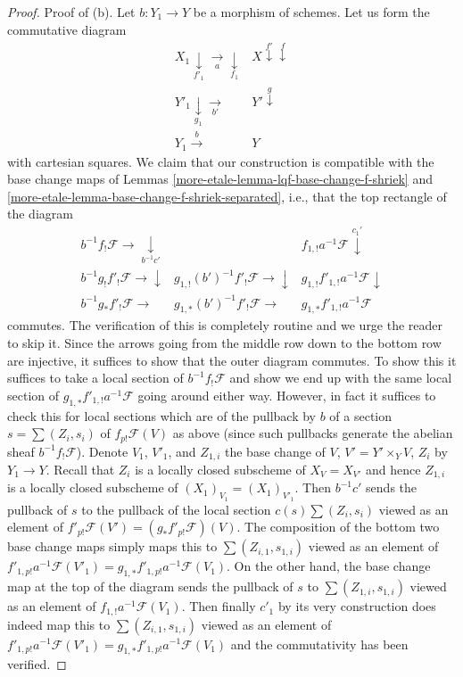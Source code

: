 \begin{proof}
\medskip\noindent
Proof of (b). Let $b : Y_1 \to Y$ be a morphism of schemes. Let us form the
commutative diagram
$$
\begin{array}{cc}X_1 \underset{f'_1}{\downarrow}\underset{a}{\longrightarrow}\underset{f_1}{\downarrow} & X \overset{f'}{\downarrow}\overset{f}{\downarrow} \\ Y'_1 \underset{g_1}{\downarrow}\underset{b'}{\longrightarrow} & Y' \overset{g}{\downarrow} \\ Y_1 \overset{b}{\longrightarrow} & Y\end{array}
$$
with cartesian squares. We claim that our construction is compatible
with the base change maps of Lemmas \ref{more-etale-lemma-lqf-base-change-f-shriek}
and \ref{more-etale-lemma-base-change-f-shriek-separated}, i.e.,
that the top rectangle of the diagram
$$
\begin{array}{ccc}b^{-1}f_!\mathcal{F} \longrightarrow\underset{b^{-1}c'}{\downarrow} &  & f_{1, !}a^{-1}\mathcal{F} \overset{c_1'}{\downarrow} \\ b^{-1}g_!f'_!\mathcal{F} \longrightarrow\downarrow & g_{1, !}(b')^{-1}f'_!\mathcal{F} \longrightarrow\downarrow & g_{1, !}f'_{1, !}a^{-1}\mathcal{F} \downarrow \\ b^{-1}g_*f'_!\mathcal{F} \longrightarrow & g_{1, *}(b')^{-1}f'_!\mathcal{F} \longrightarrow & g_{1, *}f'_{1, !}a^{-1}\mathcal{F}\end{array}
$$
commutes. The verification of this is completely routine and we
urge the reader to skip it. Since the arrows going from the middle
row down to the bottom row are injective, it suffices to show that
the outer diagram commutes.
To show this it suffices to take a local section of
$b^{-1}f_!\mathcal{F}$ and show we end up with the same local
section of $g_{1, *}f'_{1, !}a^{-1}\mathcal{F}$
going around either way. However, in fact it suffices to check
this for local sections which are of the pullback by $b$ of
a section $s = \sum (Z_i, s_i)$ of $f_{p!}\mathcal{F}(V)$
as above (since such pullbacks generate the abelian sheaf
$b^{-1}f_!\mathcal{F}$). Denote $V_1$, $V'_1$, and $Z_{1, i}$
the base change of $V$, $V' = Y' \times_Y V$, $Z_i$ by $Y_1 \to Y$.
Recall that $Z_i$ is a locally closed subscheme of $X_V = X_{V'}$
and hence $Z_{1, i}$ is a locally closed subscheme
of $(X_1)_{V_1} = (X_1)_{V'_1}$. Then $b^{-1}c'$ sends the pullback
of $s$ to the pullback of the local section $c(s) \sum (Z_i, s_i)$ viewed
as an element of $f'_{p!}\mathcal{F}(V') = (g_*f'_{p!}\mathcal{F})(V)$.
The composition of the bottom two base change maps
simply maps this to $\sum (Z_{i, 1}, s_{1, i})$ viewed as an
element of $f'_{1, p!}a^{-1}\mathcal{F}(V'_1) =
g_{1, *}f'_{1, p!}a^{-1}\mathcal{F}(V_1)$.
On the other hand, the base change map at the top of the diagram
sends the pullback of $s$ to $\sum (Z_{1, i}, s_{1, i})$ viewed
as an element of $f_{1, !}a^{-1}\mathcal{F}(V_1)$.
Then finally $c'_1$ by its very construction does indeed
map this to $\sum (Z_{i, 1}, s_{1, i})$ viewed as an
element of $f'_{1, p!}a^{-1}\mathcal{F}(V'_1) =
g_{1, *}f'_{1, p!}a^{-1}\mathcal{F}(V_1)$ and the commutativity
has been verified.


\end{proof}

